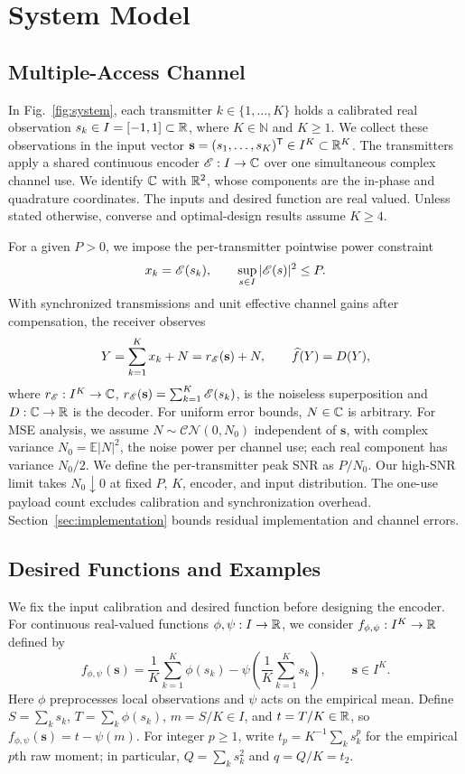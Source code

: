 \section{System Model}\label{sec:model}
\subsection{Multiple-Access Channel}
In Fig.~\ref{fig:system}, each transmitter $k\in\{1,\ldots,K\}$ holds a calibrated real observation $s_k\in I=[-1,1]\subset\mathbb R$, where $K\in\mathbb N$ and $K\ge1$. We collect these observations in the input vector $\mathbf s=(s_1,\ldots,s_K)^\mathsf T\in I^K\subset\mathbb R^K$. The transmitters apply a shared continuous encoder $\mathscr E:I\to\mathbb C$ over one simultaneous complex channel use. We identify $\mathbb C$ with $\mathbb R^2$, whose components are the in-phase and quadrature coordinates. The inputs and desired function are real valued. Unless stated otherwise, converse and optimal-design results assume $K\ge4$.

For a given $P>0$, we impose the per-transmitter pointwise power constraint
\begin{equation}
 x_k=\mathscr E(s_k),\qquad \sup_{s\in I}|\mathscr E(s)|^2\le P.
 \label{eq:peak-model}
\end{equation}
With synchronized transmissions and unit effective channel gains after compensation, the receiver observes
\begin{equation}
 Y=\sum_{k=1}^{K}x_k+N=r_\mathscr E(\mathbf s)+N,
 \qquad \widehat f(Y)=D(Y),
 \label{eq:mac-model}
\end{equation}
where $r_\mathscr E:I^K\to\mathbb C$, $r_\mathscr E(\mathbf s)=\sum_{k=1}^K\mathscr E(s_k)$, is the noiseless superposition and $D:\mathbb C\to\mathbb R$ is the decoder. For uniform error bounds, $N\in\mathbb C$ is arbitrary. For MSE analysis, we assume $N\sim\mathcal{CN}(0,N_0)$ independent of $\mathbf s$, with complex variance $N_0=\mathbb E|N|^2$, the noise power per channel use; each real component has variance $N_0/2$. We define the per-transmitter peak SNR as $P/N_0$. Our high-SNR limit takes $N_0\downarrow0$ at fixed $P$, $K$, encoder, and input distribution. The one-use payload count excludes calibration and synchronization overhead. Section~\ref{sec:implementation} bounds residual implementation and channel errors.

\subsection{Desired Functions and Examples}
We fix the input calibration and desired function before designing the encoder. For continuous real-valued functions $\phi,\psi:I\to\mathbb R$, we consider $f_{\phi,\psi}:I^K\to\mathbb R$ defined by
\begin{equation}
 f_{\phi,\psi}(\mathbf s)
 =\frac1K\sum_{k=1}^K\phi(s_k)
   -\psi\!\left(\frac1K\sum_{k=1}^Ks_k\right),
 \qquad \mathbf s\in I^K.
 \label{eq:target}
\end{equation}
Here $\phi$ preprocesses local observations and $\psi$ acts on the empirical mean. Define $S=\sum_k s_k$, $T=\sum_k\phi(s_k)$, $m=S/K\in I$, and $t=T/K\in\mathbb R$, so $f_{\phi,\psi}(\mathbf s)=t-\psi(m)$. For integer $p\ge1$, write $t_p=K^{-1}\sum_k s_k^p$ for the empirical $p$th raw moment; in particular, $Q=\sum_k s_k^2$ and $q=Q/K=t_2$.

